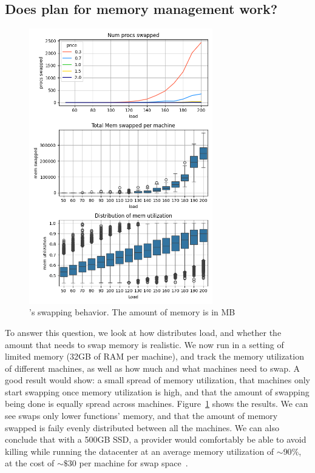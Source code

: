 \subsection{Does \sys{} plan for memory management work?}

\begin{figure}[t!]
    \centering
      \includegraphics[width=8cm]{img/memory_graphs.png}
      \caption{ \sys{}'s swapping behavior. The amount of memory is in MB  }
    \label{fig:memory-graphs}
\end{figure}

To answer this question, we look at how \sys{} distributes load, and whether the
amount that \sys{} needs to swap memory is realistic. We now run \sys{} in a
setting of limited memory (32GB of RAM per machine), and track the memory
utilization of different machines, as well as how much and what machines need to
swap. A good result would show: a small spread of memory utilization, that
machines only start swapping once memory utilization is high, and that the
amount of swapping being done is equally spread across machines.
Figure~\ref{fig:memory-graphs} shows the results. We can see \sys{} swaps only
lower \class{} functions' memory, and that the amount of memory swapped is faily
evenly distributed between all the machines. We can also conclude that with a
500GB SSD, a provider would comfortably be able to avoid killing while running
the datacenter at an average memory utilization of $\sim$90$\%$, at the cost of
$\sim\$$30 per machine for swap space~\cite{ssd-price}.


